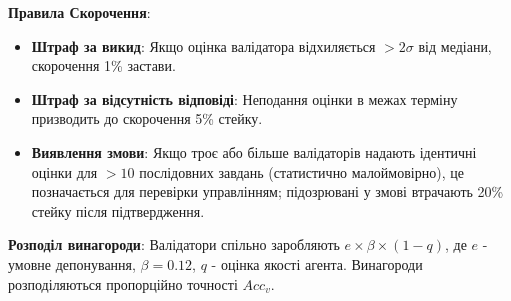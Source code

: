 \documentclass[11pt]{article}
\begin{document}
\textbf{Правила Скорочення}:
\begin{itemize}[noitemsep]
  \item \textbf{Штраф за викид}: Якщо оцінка валідатора відхиляється $>2\sigma$ від медіани, скорочення 1\% застави.
  \item \textbf{Штраф за відсутність відповіді}: Неподання оцінки в межах терміну призводить до скорочення 5\% стейку.
  \item \textbf{Виявлення змови}: Якщо троє або більше валідаторів надають ідентичні оцінки для $>10$ послідовних завдань (статистично малоймовірно), це позначається для перевірки управлінням; підозрювані у змові втрачають 20\% стейку після підтвердження.
\end{itemize}
\textbf{Розподіл винагороди}: Валідатори спільно заробляють $e \times \beta \times (1-q)$, де $e$ - умовне депонування, $\beta=0.12$, $q$ - оцінка якості агента. Винагороди розподіляються пропорційно точності $Acc_v$.
\end{document}
